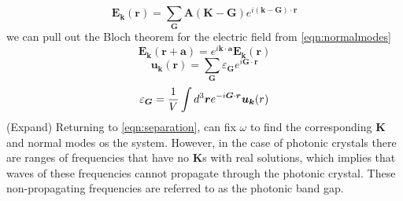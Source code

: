 \begin{equation}
	\boldsymbol{E}_{\boldsymbol{k}}(\boldsymbol{r}) = \sum_{\boldsymbol{G}}\boldsymbol{A}(\boldsymbol{K}-\boldsymbol{G})e^{i(\boldsymbol{k}-\boldsymbol{G})\cdot \boldsymbol{r}}
	\label{eqn:normalmodes}
\end{equation}
we can pull out the Bloch theorem for the electric field from \eqref{eqn:normalmodes}
\begin{equation}
	\boldsymbol{E}_{\boldsymbol{k}}(\boldsymbol{r}+\boldsymbol{a}) = e^{i\boldsymbol{k}\cdot \boldsymbol{a}}\boldsymbol{E}_{\boldsymbol{k}}(\boldsymbol{r})
\end{equation}
\begin{equation}
	\boldsymbol{u_k}(\boldsymbol{r}) = \sum_{\boldsymbol{G}}\varepsilon_{\boldsymbol{G}}e^{i\boldsymbol{G}\cdot\boldsymbol{r}}  
\end{equation}
\begin{equation}
	\varepsilon_{\boldsymbol{G}} = \frac{1}{V}\int d^3\boldsymbol{r}e^{-i\boldsymbol{G}\cdot\boldsymbol{r}}\boldsymbol{u_k}(\boldmath{r})  
	\label{eqn:perm}
\end{equation}
(Expand)  Returning to \eqref{eqn:separation}, can fix $\omega$ to find the corresponding $\boldsymbol{K}$ and normal modes os the system. However, in the case of photonic crystals there are ranges of frequencies that  have no $\boldsymbol{K}$s with real solutions, which implies that waves of these frequencies cannot propagate through the photonic crystal. These non-propagating frequencies are referred to as the photonic band gap.

